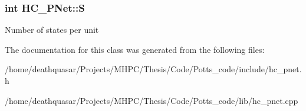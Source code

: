 \subsubsection[{\texorpdfstring{S}{S}}]{\setlength{\rightskip}{0pt plus 5cm}int H\+C\+\_\+\+P\+Net\+::S\hspace{0.3cm}{\ttfamily [private]}}\hypertarget{classHC__PNet_a059016e26712e4fd5f6fdbdc6a41ce79}{}\label{classHC__PNet_a059016e26712e4fd5f6fdbdc6a41ce79}
Number of states per unit 

The documentation for this class was generated from the following files\+:\begin{DoxyCompactItemize}
\item 
/home/deathquasar/\+Projects/\+M\+H\+P\+C/\+Thesis/\+Code/\+Potts\+\_\+code/include/hc\+\_\+pnet.\+h\item 
/home/deathquasar/\+Projects/\+M\+H\+P\+C/\+Thesis/\+Code/\+Potts\+\_\+code/lib/hc\+\_\+pnet.\+cpp\end{DoxyCompactItemize}
